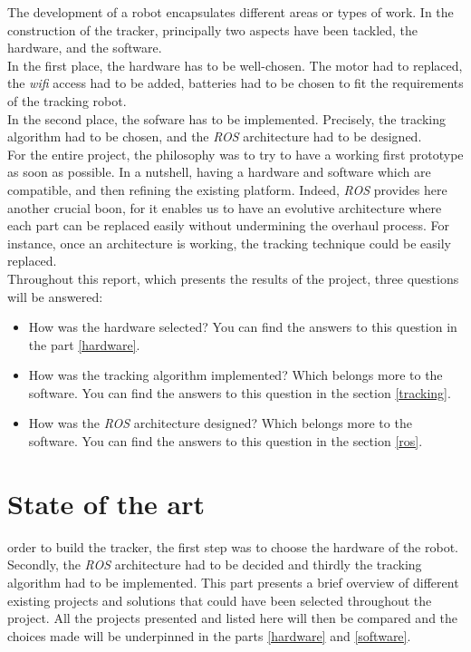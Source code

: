 		The development of a robot encapsulates different areas or types of work.
		In the construction of the tracker, principally two aspects 
		have been tackled, the hardware, and the software.
		\\\indent In the first place, the hardware has to be well-chosen.
		The motor had to replaced, the \textit{wifi} access had to be added, batteries 
		had to be chosen to fit the requirements of the tracking robot.
		\\\indent In the second place, the sofware has to be implemented. Precisely, 
		the tracking algorithm had to be chosen, and the \textit{ROS} architecture had 
		to be designed.
		\\\indent For the entire project, the philosophy was to try to have 
		a working first prototype as soon as possible. In a nutshell, 
		having a hardware and software which are compatible, and then refining
		the existing platform. Indeed, \textit{ROS} provides here another
		crucial boon, for it enables us to have an evolutive architecture 
		where each part can be replaced easily without 
		undermining the overhaul process. For instance, once 
		an architecture is working, the tracking technique could
		be easily replaced.
		\\\indent Throughout this report, which presents the 
		results of the project, three questions will be answered:
		\begin{itemize}
			\item[\textbullet] How was the hardware selected?
			You can find the answers to 
			this question in the part \vref{hardware}.
			\item[\textbullet] How was the tracking algorithm implemented? Which belongs 
			more to the software. You can find the answers to 
			this question in the section \vref{tracking}.
			\item[\textbullet] How was the \textit{ROS} architecture designed? 
			Which belongs more to the software. You can find the answers to 
			this question in the section \vref{ros}.
		\end{itemize}

\chapter{State of the art}\label{stateofart}

		 order to build the tracker, the first step was to choose the
		hardware of the robot. Secondly, the \textit{ROS} architecture had to be decided
		and thirdly the tracking algorithm had to be implemented. This part 
		presents a brief overview of different existing projects and solutions 
		that could have been selected throughout the project. All the projects
		presented and listed here will then be compared and the choices
		made will be underpinned in the parts \vref{hardware} and \vref{software}.
		
